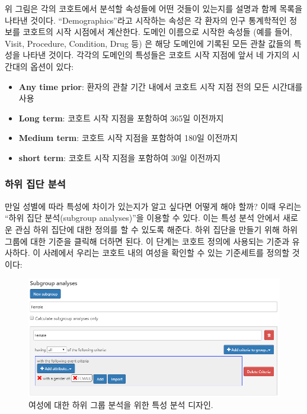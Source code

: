 \documentclass[11pt]{book}
\theoremstyle{definition}
\theoremstyle{definition}
\theoremstyle{definition}
\theoremstyle{remark}
\begin{document}
위 그림은 각의 코호트에서 분석할 속성들에 어떤 것들이 있는지를 설명과
함께 목록을 나타낸 것이다. ``Demographics''라고 시작하는 속성은 각
환자의 인구 통계학적인 정보를 코호트의 시작 시점에서 계산한다. 도메인
이름으로 시작한 속성들 (예를 들어, Visit, Procedure, Condition, Drug 등)
은 해당 도메인에 기록된 모든 관찰 값들의 특성을 나타낸 것이다. 각각의
도메인의 특성들은 코호트 시작 지점에 앞서 네 가지의 시간대의 옵션이
있다:

\begin{itemize}
\item
  \textbf{Any time prior}: 환자의 관찰 기간 내에서 코호트 시작 지점 전의
  모든 시간대를 사용
\item
  \textbf{Long term}: 코호트 시작 지점을 포함하여 365일 이전까지
\item
  \textbf{Medium term}: 코호트 시작 지점을 포함하여 180일 이전까지
\item
  \textbf{short term}: 코호트 시작 지점을 포함하여 30일 이전까지
\end{itemize}

\subsubsection*{하위 집단 분석}\label{--}

만일 성별에 따라 특성에 차이가 있는지가 알고 싶다면 어떻게 해야 할까?
이때 우리는 ``하위 집단 분석(subgroup analyses)''을 이용할 수 있다. 이는
특성 분석 안에서 새로운 관심 하위 집단에 대한 정의를 할 수 있도록
해준다. 하위 집단을 만들기 위해 하위 그룹에 대한 기준을 클릭해 더하면
된다. 이 단계는 코호트 정의에 사용되는 기준과 유사하다. 이 사례에서
우리는 코호트 내의 여성을 확인할 수 있는 기준세트를 정의할 것이다:

\begin{figure}

{\centering \includegraphics[width=1\linewidth]{images/Characterization/atlasCharacterizationSubgroup} 

}

\caption{여성에 대한 하위 그룹 분석을 위한 특성 분석 디자인.}\label{fig:atlasCharacterizationSubgroup}
\end{figure}
\end{document}
